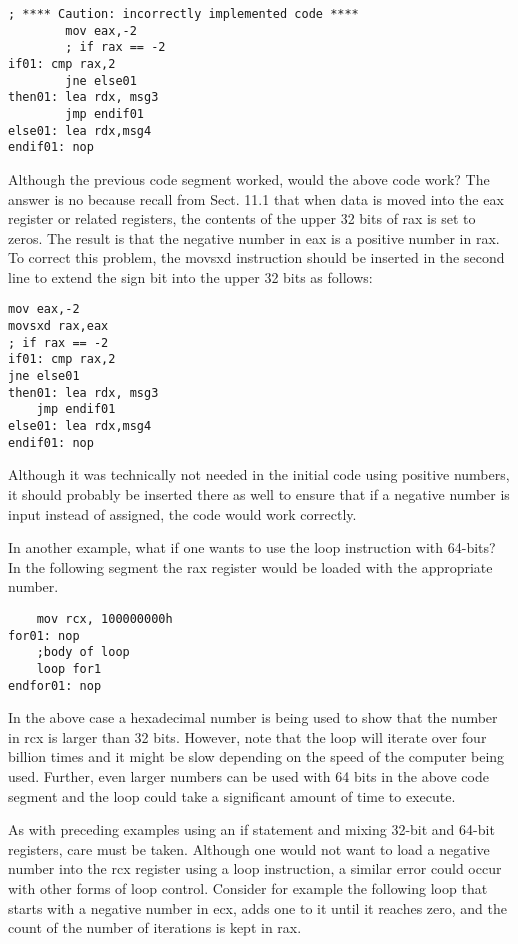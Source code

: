 \documentclass[10pt]{article}
\begin{document}
\begin{verbatim}
; **** Caution: incorrectly implemented code ****
        mov eax,-2
        ; if rax == -2
if01: cmp rax,2
        jne else01
then01: lea rdx, msg3
        jmp endif01
else01: lea rdx,msg4
endif01: nop
\end{verbatim}

Although the previous code segment worked, would the above code work? The answer is no because recall from Sect. 11.1 that when data is moved into the eax register or related registers, the contents of the upper 32 bits of rax is set to zeros. The result is that the negative number in eax is a positive number in rax. To correct this problem, the movsxd instruction should be inserted in the second line to extend the sign bit into the upper 32 bits as follows:

\begin{verbatim}
mov eax,-2
movsxd rax,eax
; if rax == -2
if01: cmp rax,2
jne else01
then01: lea rdx, msg3
    jmp endif01
else01: lea rdx,msg4
endif01: nop
\end{verbatim}

Although it was technically not needed in the initial code using positive numbers, it should probably be inserted there as well to ensure that if a negative number is input instead of assigned, the code would work correctly.

In another example, what if one wants to use the loop instruction with 64-bits? In the following segment the rax register would be loaded with the appropriate number.

\begin{verbatim}
    mov rcx, 100000000h
for01: nop
    ;body of loop
    loop for1
endfor01: nop
\end{verbatim}

In the above case a hexadecimal number is being used to show that the number in rcx is larger than 32 bits. However, note that the loop will iterate over four billion times and it might be slow depending on the speed of the computer being used. Further, even larger numbers can be used with 64 bits in the above code segment and the loop could take a significant amount of time to execute.

As with preceding examples using an if statement and mixing 32-bit and 64-bit registers, care must be taken. Although one would not want to load a negative number into the rcx register using a loop instruction, a similar error could occur with other forms of loop control. Consider for example the following loop that starts with a negative number in ecx, adds one to it until it reaches zero, and the count of the number of iterations is kept in rax.
\end{document}
